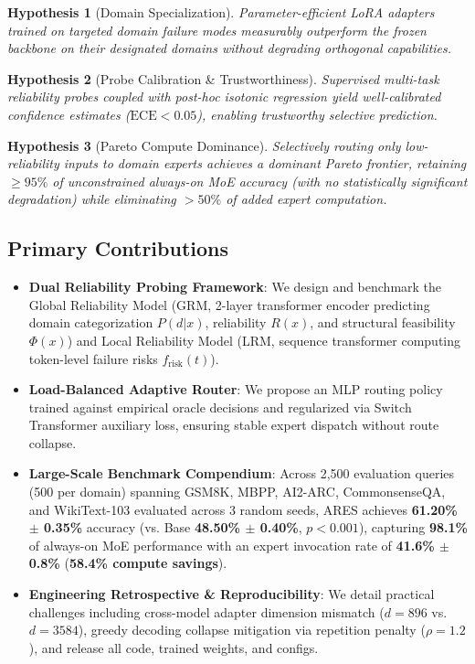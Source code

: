 \documentclass[journal,10pt,twocolumn]{IEEEtran}
\newtheorem{hypothesis}{Hypothesis}
\begin{document}
\begin{hypothesis}[Domain Specialization]
Parameter-efficient LoRA adapters trained on targeted domain failure modes measurably outperform the frozen backbone on their designated domains without degrading orthogonal capabilities.
\end{hypothesis}

\begin{hypothesis}[Probe Calibration \& Trustworthiness]
Supervised multi-task reliability probes coupled with post-hoc isotonic regression yield well-calibrated confidence estimates ($\text{ECE} < 0.05$), enabling trustworthy selective prediction.
\end{hypothesis}

\begin{hypothesis}[Pareto Compute Dominance]
Selectively routing only low-reliability inputs to domain experts achieves a dominant Pareto frontier, retaining $\ge 95\%$ of unconstrained always-on MoE accuracy (with no statistically significant degradation) while eliminating $> 50\%$ of added expert computation.
\end{hypothesis}

\subsection{Primary Contributions}
\begin{itemize}
    \item \textbf{Dual Reliability Probing Framework}: We design and benchmark the Global Reliability Model (GRM, 2-layer transformer encoder predicting domain categorization $P(d|x)$, reliability $R(x)$, and structural feasibility $\Phi(x)$) and Local Reliability Model (LRM, sequence transformer computing token-level failure risks $f_{\text{risk}}(t)$).
    \item \textbf{Load-Balanced Adaptive Router}: We propose an MLP routing policy trained against empirical oracle decisions and regularized via Switch Transformer auxiliary loss, ensuring stable expert dispatch without route collapse.
    \item \textbf{Large-Scale Benchmark Compendium}: Across 2,500 evaluation queries (500 per domain) spanning GSM8K, MBPP, AI2-ARC, CommonsenseQA, and WikiText-103 evaluated across 3 random seeds, ARES achieves \textbf{61.20\% $\pm$ 0.35\%} accuracy (vs. Base \textbf{48.50\% $\pm$ 0.40\%}, $p < 0.001$), capturing \textbf{98.1\%} of always-on MoE performance with an expert invocation rate of \textbf{41.6\% $\pm$ 0.8\%} (\textbf{58.4\% compute savings}).
    \item \textbf{Engineering Retrospective \& Reproducibility}: We detail practical challenges including cross-model adapter dimension mismatch ($d=896$ vs. $d=3584$), greedy decoding collapse mitigation via repetition penalty ($\rho = 1.2$), and release all code, trained weights, and configs.
\end{itemize}
\end{document}

